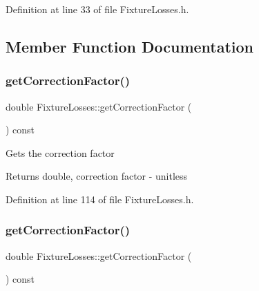 Definition at line 33 of file Fixture\+Losses.\+h.



\subsection{Member Function Documentation}
\mbox{\label{class_fixture_losses_af643d715a8b1369efa586fa43e75c732}} 
\subsubsection{\texorpdfstring{get\+Correction\+Factor()}{getCorrectionFactor()}\hspace{0.1cm}{\footnotesize\ttfamily [1/3]}}
{\footnotesize\ttfamily double Fixture\+Losses\+::get\+Correction\+Factor (\begin{DoxyParamCaption}{ }\end{DoxyParamCaption}) const\hspace{0.3cm}{\ttfamily [inline]}}

Gets the correction factor \begin{DoxyReturn}{Returns}
double, correction factor -\/ unitless 
\end{DoxyReturn}


Definition at line 114 of file Fixture\+Losses.\+h.

\mbox{\label{class_fixture_losses_af643d715a8b1369efa586fa43e75c732}} 
\subsubsection{\texorpdfstring{get\+Correction\+Factor()}{getCorrectionFactor()}\hspace{0.1cm}{\footnotesize\ttfamily [2/3]}}
{\footnotesize\ttfamily double Fixture\+Losses\+::get\+Correction\+Factor (\begin{DoxyParamCaption}{ }\end{DoxyParamCaption}) const\hspace{0.3cm}{\ttfamily [inline]}}


